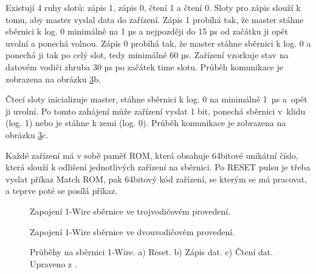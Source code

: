 Existují 4 ruhy slotů: zápis 1, zápis 0, čtení 1 a čtení 0. Sloty pro zápis slouží k tomu, aby master vyslal data do zařízení. Zápis 1 probíhá tak, že master stáhne sběrnici k log. 0 minimálně na 1 µs a nejpozději do 15 µs od začátku ji opět uvolní a ponechá volnou. Zápis 0 probíhá tak, že master stáhne sběrnici k log. 0 a ponechá ji tak po celý slot, tedy minimálně 60 µs. Zařízení vzorkuje stav na datovém vodiči zhruba 30 µs po začátek time slotu. Průběh komunikace je zobrazena na obrázku \ref{fig:1-wire-reset-vysilani-prijem-dat}b.

Čtecí sloty inicializuje master, stáhne sběrnici k log. 0 na minimálně 1~µs a~opět ji uvolní. Po tomto zahájení může zařízení vyslat 1 bit, ponechá sběrnici v~klidu (log. 1) nebo je stáhne k zemi (log. 0). Průběh komunikace je zobrazena na obrázku \ref{fig:1-wire-reset-vysilani-prijem-dat}c.

Každé zařízení má v sobě paměť ROM, která obsahuje 64bitové unikátní číslo, která slouží k odlišení jednotlivých zařízení na sběrnici. Po RESET pulsu je třeba vyslat příkaz Match ROM, pak 64bitový kód zařízení, se kterým se má pracovat, a teprve poté se posílá příkaz.


\begin{figure}[H]
    \centering
    \def\svgwidth{\columnwidth}
    
    \caption{Zapojení 1-Wire sběrnice ve trojvodičovém provedení.}
    \label{fig:1-wire-sbernice-tri-vodice}
\end{figure}

\begin{figure}[H]
    \centering
    \def\svgwidth{\columnwidth}
    
    \caption{Zapojení 1-Wire sběrnice ve dvouvodičovém provedení.}
    \label{fig:1-wire-sbernice-dva-vodice}
\end{figure}



\begin{figure}[H]
    \centering
    \def\svgwidth{0.99\columnwidth}
    
    \caption[Průběhy na sběrnici 1-Wire.]{Průběhy na sběrnici 1-Wire.
    a) Reset. b) Zápis dat. c) Čtení dat. Upraveno z \cite{1-wire-sbernice-prubehy}.}
    \label{fig:1-wire-reset-vysilani-prijem-dat}
\end{figure}

